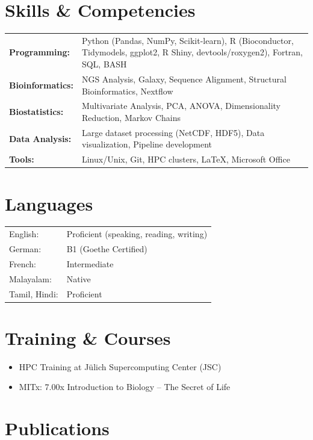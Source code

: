 \documentclass[margin,line,pifont,palatino,courier]{res}
\begin{document}
\begin{resume}
\section{\sc Skills \& Competencies}

\begin{tabular}{@{}p{1.5in}p{4in}}
{\bf Programming:} & Python (Pandas, NumPy, Scikit-learn), R (Bioconductor, Tidymodels, ggplot2, R Shiny, devtools/roxygen2), Fortran, SQL, BASH\\[1ex]
{\bf Bioinformatics:} & NGS Analysis, Galaxy, Sequence Alignment, Structural Bioinformatics, Nextflow\\[1ex]
{\bf Biostatistics:} & Multivariate Analysis, PCA, ANOVA, Dimensionality Reduction, Markov Chains\\[1ex]
{\bf Data Analysis:} & Large dataset processing (NetCDF, HDF5), Data visualization, Pipeline development\\[1ex]
{\bf Tools:} & Linux/Unix, Git, HPC clusters, \LaTeX, Microsoft Office
\end{tabular}

\section{\sc Languages}

\begin{tabular}{@{}p{1.2in}p{4in}}
English: & Proficient (speaking, reading, writing)\\
German: & B1 (Goethe Certified)\\
French: & Intermediate\\
Malayalam: & Native\\
Tamil, Hindi: & Proficient\\
\end{tabular}

\section{\sc Training \& Courses}

\begin{itemize}
\item[-] HPC Training at J\"ulich Supercomputing Center (JSC)
\item[-] MITx: 7.00x Introduction to Biology -- The Secret of Life
\end{itemize}

\section{\sc Publications}


\end{resume}
\end{document}
